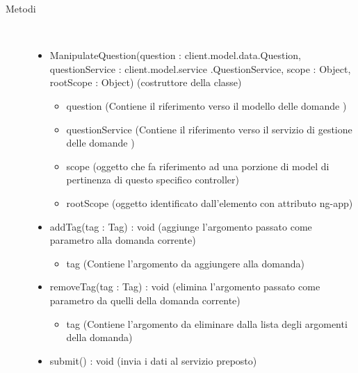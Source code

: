 \begin{description}
\item[Metodi] \hfill \\
 \vspace{-7mm}
\begin{itemize}
\item ManipulateQuestion(question : client.model.data.Question, questionService : client.model.service .QuestionService, scope : Object, rootScope : Object) (costruttore della classe)\begin{itemize}
\item question (Contiene il riferimento verso il modello delle domande )
\item questionService (Contiene il riferimento verso il servizio di gestione delle domande )
\item scope (oggetto che fa riferimento ad una porzione di model di pertinenza di questo specifico controller)
\item rootScope (oggetto identificato dall’elemento con attributo ng-app)
\end{itemize}

\item addTag(tag : Tag) : void (aggiunge l'argomento passato come parametro alla domanda corrente)\begin{itemize}
\item tag (Contiene l'argomento da aggiungere alla domanda)
\end{itemize}

\item removeTag(tag : Tag) : void (elimina l'argomento passato come parametro da quelli della domanda corrente)\begin{itemize}
\item tag (Contiene l'argomento da eliminare dalla lista degli argomenti della domanda)
\end{itemize}

\item submit() : void (invia i dati al servizio preposto)
\end{itemize}

\end{description}

